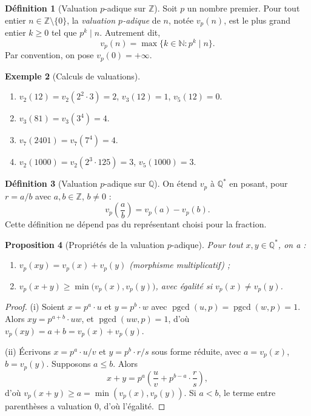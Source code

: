 \documentclass[12pt,a4paper,openany]{book}
\theoremstyle{definition}
\newtheorem{definition}{Définition}[chapter]
\newtheorem{exemple}[definition]{Exemple}
\theoremstyle{plain}
\newtheorem{proposition}[definition]{Proposition}
\theoremstyle{remark}
\newcommand{\N}{\mathbb{N}}
\newcommand{\Z}{\mathbb{Z}}
\newcommand{\Q}{\mathbb{Q}}
\DeclareMathOperator{\pgcd}{pgcd}
\begin{document}
\begin{definition}[Valuation $p$-adique sur $\Z$]
\label{def:valuation-p-adique-Z}
Soit $p$ un nombre premier. Pour tout entier $n \in \Z \setminus \{0\}$, la
\emph{valuation $p$-adique} de $n$,
notée $v_p(n)$, est le plus grand entier $k \geq 0$ tel que $p^k \mid n$.
Autrement dit,
\[
  v_p(n) = \max\bigl\{ k \in \N : p^k \mid n \bigr\}.
\]
Par convention, on pose $v_p(0) = +\infty$.
\end{definition}

\begin{exemple}[Calculs de valuations]
\label{ex:calculs-valuations}
\begin{enumerate}[label=(\roman*)]
  \item $v_2(12) = v_2(2^2 \cdot 3) = 2$, \quad $v_3(12) = 1$, \quad $v_5(12) = 0$.
  \item $v_3(81) = v_3(3^4) = 4$.
  \item $v_7(2401) = v_7(7^4) = 4$.
  \item $v_2(1000) = v_2(2^3 \cdot 125) = 3$, \quad $v_5(1000) = 3$.
\end{enumerate}
\end{exemple}

\begin{definition}[Valuation $p$-adique sur $\Q$]
\label{def:valuation-p-adique-Q}
On étend $v_p$ à $\Q^*$ en posant, pour $r = a/b$ avec $a,b \in \Z$, $b \neq 0$ :
\[
  v_p\!\left(\frac{a}{b}\right) = v_p(a) - v_p(b).
\]
Cette définition ne dépend pas du représentant choisi pour la fraction.
\end{definition}

\begin{proposition}[Propriétés de la valuation $p$-adique]
\label{prop:proprietes-valuation}
Pour tout $x, y \in \Q^*$, on a :
\begin{enumerate}[label=(\roman*)]
  \item $v_p(xy) = v_p(x) + v_p(y)$ \quad (morphisme multiplicatif) ;
  \item $v_p(x + y) \geq \min\bigl(v_p(x), v_p(y)\bigr)$, avec égalité si
    $v_p(x) \neq v_p(y)$.
\end{enumerate}
\end{proposition}

\begin{proof}
(i) Soient $x = p^a \cdot u$ et $y = p^b \cdot w$ avec $\pgcd(u, p) = \pgcd(w, p) = 1$.
Alors $xy = p^{a+b} \cdot uw$, et $\pgcd(uw, p) = 1$, d'où $v_p(xy) = a + b = v_p(x) + v_p(y)$.

(ii) Écrivons $x = p^a \cdot u/v$ et $y = p^b \cdot r/s$ sous forme réduite,
avec $a = v_p(x)$, $b = v_p(y)$. Supposons $a \leq b$. Alors
\[
  x + y = p^a \left( \frac{u}{v} + p^{b-a} \cdot \frac{r}{s} \right),
\]
d'où $v_p(x+y) \geq a = \min(v_p(x), v_p(y))$. Si $a < b$, le terme entre
parenthèses a valuation $0$, d'où l'égalité.
\end{proof}
\end{document}
